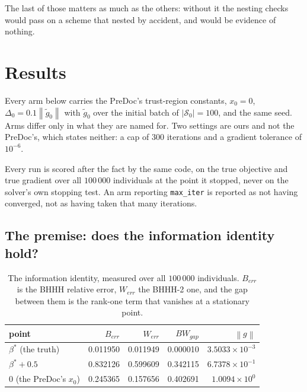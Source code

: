 \documentclass[11pt,a4paper]{article}
\providecommand{\norm}[1]{\left \lVert #1 \right \rVert}
\begin{document}
The last of those matters as much as the others: without it the nesting checks
would pass on a scheme that nested by accident, and would be evidence of nothing.

\section{Results}

Every arm below carries the PreDoc's trust-region constants, $x_0 = 0$,
$\Delta_0 = 0.1\norm{\tilde g_0}$ with $\tilde g_0$ over the initial batch of
$\lvert\mathcal{S}_0\rvert = 100$, and the same seed. Arms differ only in what they
are named for. Two settings are ours and not the PreDoc's, which states neither: a
cap of 300 iterations and a gradient tolerance of $10^{-6}$.

Every run is scored after the fact by the same code, on the true objective and true
gradient over all $100\,000$ individuals at the point it stopped, never on the
solver's own stopping test. An arm reporting \texttt{max\_iter} is reported as not
having converged, not as having taken that many iterations.

\subsection{The premise: does the information identity hold?}

\begin{table}[H]
\centering
\caption{The information identity, measured over all $100\,000$ individuals.
$B_{err}$ is the BHHH relative error, $W_{err}$ the BHHH-2 one, and the gap between
them is the rank-one term that vanishes at a stationary point.}
\label{tab:identity}
\begin{tabular}{lrrrr}
\toprule
point & $B_{err}$ & $W_{err}$ & $BW_{gap}$ & $\norm{g}$ \\
\midrule
$\beta^*$ (the truth)     & 0.011950 & 0.011949 & 0.000010 & $3.5033\times10^{-3}$ \\
$\beta^* + 0.5$           & 0.832126 & 0.599609 & 0.342115 & $6.7378\times10^{-1}$ \\
$0$ (the PreDoc's $x_0$)  & 0.245365 & 0.157656 & 0.402691 & $1.0094\times10^{0}$ \\
\bottomrule
\end{tabular}
\end{table}
\end{document}
